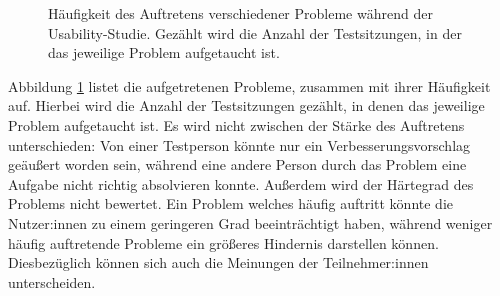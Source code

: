 \begin{figure}[!ht]
  \caption{Häufigkeit des Auftretens verschiedener Probleme während der Usability-Studie. Gezählt wird die Anzahl der Testsitzungen, in der das jeweilige Problem aufgetaucht ist.}
  \label{fig:problems}
\end{figure}

Abbildung \ref{fig:problems} listet die aufgetretenen Probleme, zusammen mit ihrer Häufigkeit auf. Hierbei wird die Anzahl der Testsitzungen gezählt, in denen das jeweilige Problem aufgetaucht ist. Es wird nicht zwischen der Stärke des Auftretens unterschieden: Von einer Testperson könnte nur ein Verbesserungsvorschlag geäußert worden sein, während eine andere Person durch das Problem eine Aufgabe nicht richtig absolvieren konnte. Außerdem wird der Härtegrad des Problems nicht bewertet. Ein Problem welches häufig auftritt könnte die Nutzer:innen zu einem geringeren Grad beeinträchtigt haben, während weniger häufig auftretende Probleme ein größeres Hindernis darstellen können. Diesbezüglich können sich auch die Meinungen der Teilnehmer:innen unterscheiden.

